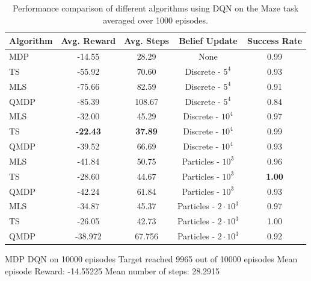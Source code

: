 \begin{table}[H]
    \centering
    \begin{tabular}{lcccc}
    \toprule
    \textbf{Algorithm} & \textbf{Avg. Reward} & \textbf{Avg. Steps} & \textbf{Belief Update} & \textbf{Success Rate}\\
    \midrule
    MDP & -14.55 & 28.29 & None & 0.99 \\
    \midrule
    TS & -55.92 & 70.60 & Discrete - $5^4$ & 0.93 \\
    MLS & -75.66 & 82.59 & Discrete - $5^4$ & 0.91 \\
    QMDP & -85.39 & 108.67 & Discrete - $5^4$ & 0.84 \\
    \midrule
    MLS & -32.00 & 45.29 & Discrete - $10^4$ & 0.97 \\
    TS & \textbf{-22.43} & \textbf{37.89} & Discrete - $10^4$ & 0.99 \\
    QMDP & -39.52 & 66.69 & Discrete - $10^4$ & 0.93 \\
    \midrule
    MLS & -41.84 & 50.75 & Particles - $10^3$ & 0.96 \\
    TS & -28.60 & 44.67 & Particles - $10^3$ & \textbf{1.00} \\
    QMDP & -42.24 & 61.84 & Particles - $10^3$ & 0.93 \\
    \midrule
    MLS & -34.87 & 45.37 & Particles - $2\cdot10^3$ & 0.97 \\
    TS & -26.05 & 42.73 & Particles - $2\cdot10^3$ & 1.00 \\
    QMDP & -38.972 & 67.756 & Particles - $2\cdot10^3$ & 0.92 \\
    \bottomrule
    \end{tabular}
    \caption{Performance comparison of different algorithms using DQN on the Maze task averaged over 1000 episodes.}
    \label{tab:maze_results_dqn}
\end{table}

MDP DQN on 10000 episodes  
Target reached 9965 out of 10000 episodes
Mean episode Reward:  -14.55225
Mean number of steps:  28.2915


